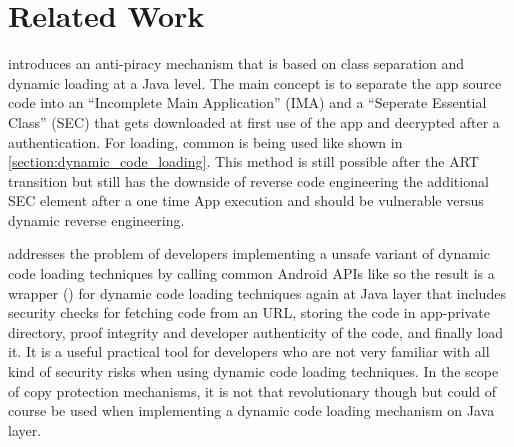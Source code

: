 \chapter{Related Work}\label{chapter:related_workd}
\parencite{anti_piracy} introduces an anti-piracy mechanism that is based on class
separation and dynamic loading at a Java level. The main concept is to separate the app source code into an ``Incomplete Main Application'' (IMA) and a ``Seperate Essential Class'' (SEC) that gets downloaded at first use of the app and decrypted after a authentication. For loading, common  is being used like shown in
\autoref{section:dynamic_code_loading}. This method is still possible after the ART transition but still has the downside of reverse code engineering the additional SEC 
element after a one time App execution and should be vulnerable versus dynamic reverse engineering.

\parencite{grab_n_run} addresses the problem of developers implementing a unsafe variant of dynamic code loading techniques by calling common Android APIs like  so the result is a wrapper () for dynamic code loading techniques again at Java layer that includes security checks for fetching code from an URL, storing the code in app-private directory, proof integrity and developer authenticity of the code, and finally load it. It is a useful practical tool for developers who are not very familiar with all kind of security risks when using dynamic code loading techniques. In the scope of copy protection mechanisms, it is not that revolutionary though but could of course be used when implementing a dynamic code loading mechanism on Java layer.




